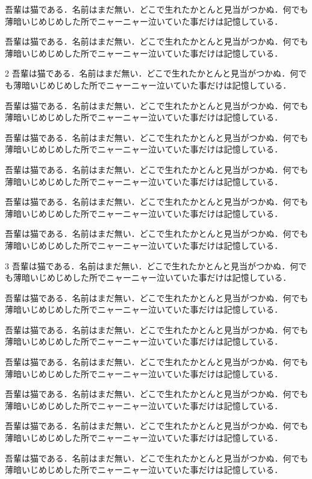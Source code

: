 \documentclass[fontsize=10pt]{jlreq}
\newcommand\para{吾輩は猫である．名前はまだ無い．どこで生れたかとんと見当がつかぬ．何でも薄暗いじめじめした所でニャーニャー泣いていた事だけは記憶している．\par}
\begin{document}
\para\para
\begin{multicols}{2}
\para\para\para\para\para
\end{multicols}
\para
\begin{multicols}{3}
\para\para\para\para\para\para
\end{multicols}
\para
\end{document}
